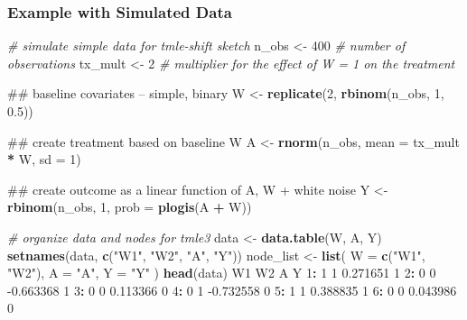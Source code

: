 \documentclass[12pt, krantz2,]{krantz}
\newenvironment{Shaded}{\begin{snugshade}}{\end{snugshade}}
\newcommand{\CommentTok}[1]{\textcolor[rgb]{0.37,0.37,0.37}{\textit{#1}}}
\newcommand{\DataTypeTok}[1]{\textcolor[rgb]{0.27,0.27,0.27}{#1}}
\newcommand{\DecValTok}[1]{\textcolor[rgb]{0.06,0.06,0.06}{#1}}
\newcommand{\FloatTok}[1]{\textcolor[rgb]{0.06,0.06,0.06}{#1}}
\newcommand{\KeywordTok}[1]{\textcolor[rgb]{0.27,0.27,0.27}{\textbf{#1}}}
\newcommand{\NormalTok}[1]{#1}
\newcommand{\OperatorTok}[1]{\textcolor[rgb]{0.43,0.43,0.43}{\textbf{#1}}}
\newcommand{\StringTok}[1]{\textcolor[rgb]{0.5,0.5,0.5}{#1}}
\theoremstyle{definition}
\theoremstyle{definition}
\theoremstyle{definition}
\newcommand{\1}{\mathbbm{1}}
\begin{document}
\hypertarget{example-with-simulated-data}{%
\subsubsection{Example with Simulated Data}\label{example-with-simulated-data}}

\begin{Shaded}
\begin{Highlighting}[]
\CommentTok{# simulate simple data for tmle-shift sketch}
\NormalTok{n_obs <-}\StringTok{ }\DecValTok{400} \CommentTok{# number of observations}
\NormalTok{tx_mult <-}\StringTok{ }\DecValTok{2} \CommentTok{# multiplier for the effect of W = 1 on the treatment}

\NormalTok{## baseline covariates -- simple, binary}
\NormalTok{W <-}\StringTok{ }\KeywordTok{replicate}\NormalTok{(}\DecValTok{2}\NormalTok{, }\KeywordTok{rbinom}\NormalTok{(n_obs, }\DecValTok{1}\NormalTok{, }\FloatTok{0.5}\NormalTok{))}

\NormalTok{## create treatment based on baseline W}
\NormalTok{A <-}\StringTok{ }\KeywordTok{rnorm}\NormalTok{(n_obs, }\DataTypeTok{mean =}\NormalTok{ tx_mult }\OperatorTok{*}\StringTok{ }\NormalTok{W, }\DataTypeTok{sd =} \DecValTok{1}\NormalTok{)}

\NormalTok{## create outcome as a linear function of A, W + white noise}
\NormalTok{Y <-}\StringTok{ }\KeywordTok{rbinom}\NormalTok{(n_obs, }\DecValTok{1}\NormalTok{, }\DataTypeTok{prob =} \KeywordTok{plogis}\NormalTok{(A }\OperatorTok{+}\StringTok{ }\NormalTok{W))}

\CommentTok{# organize data and nodes for tmle3}
\NormalTok{data <-}\StringTok{ }\KeywordTok{data.table}\NormalTok{(W, A, Y)}
\KeywordTok{setnames}\NormalTok{(data, }\KeywordTok{c}\NormalTok{(}\StringTok{"W1"}\NormalTok{, }\StringTok{"W2"}\NormalTok{, }\StringTok{"A"}\NormalTok{, }\StringTok{"Y"}\NormalTok{))}
\NormalTok{node_list <-}\StringTok{ }\KeywordTok{list}\NormalTok{(}
  \DataTypeTok{W =} \KeywordTok{c}\NormalTok{(}\StringTok{"W1"}\NormalTok{, }\StringTok{"W2"}\NormalTok{),}
  \DataTypeTok{A =} \StringTok{"A"}\NormalTok{,}
  \DataTypeTok{Y =} \StringTok{"Y"}
\NormalTok{)}
\KeywordTok{head}\NormalTok{(data)}
\NormalTok{   W1 W2         A Y}
\DecValTok{1}\OperatorTok{:}\StringTok{  }\DecValTok{1}  \DecValTok{1}  \FloatTok{0.271651} \DecValTok{1}
\DecValTok{2}\OperatorTok{:}\StringTok{  }\DecValTok{0}  \DecValTok{0} \FloatTok{-0.663368} \DecValTok{1}
\DecValTok{3}\OperatorTok{:}\StringTok{  }\DecValTok{0}  \DecValTok{0}  \FloatTok{0.113366} \DecValTok{0}
\DecValTok{4}\OperatorTok{:}\StringTok{  }\DecValTok{0}  \DecValTok{1} \FloatTok{-0.732558} \DecValTok{0}
\DecValTok{5}\OperatorTok{:}\StringTok{  }\DecValTok{1}  \DecValTok{1}  \FloatTok{0.388835} \DecValTok{1}
\DecValTok{6}\OperatorTok{:}\StringTok{  }\DecValTok{0}  \DecValTok{0}  \FloatTok{0.043986} \DecValTok{0}
\end{Highlighting}
\end{Shaded}
\end{document}
